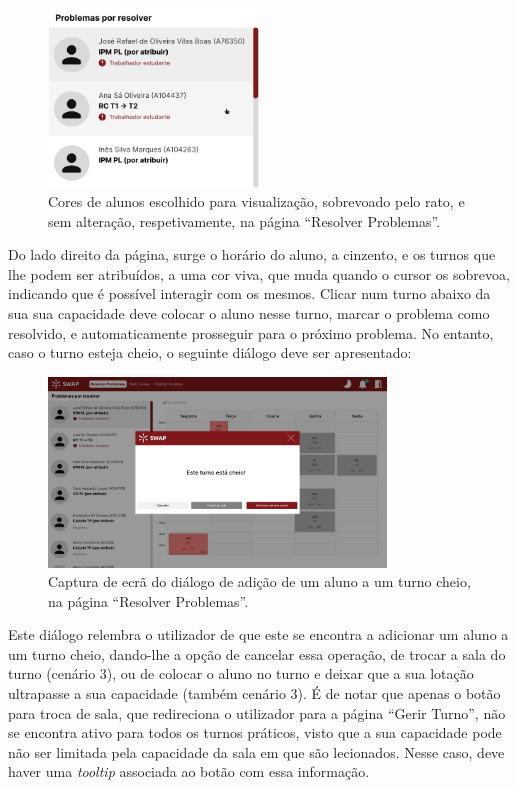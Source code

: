 \documentclass[12pt, a4paper]{article}
\begin{document}
\begin{figure}[H]
    \centering
    \includegraphics[width=0.5\textwidth]{res/prototype/resolver-problemas-hover.png}
    \caption{
        \onehalfspacing
        Cores de alunos escolhido para visualização, sobrevoado pelo rato, e sem alteração,
        respetivamente, na página ``Resolver Problemas''.
    }
    \label{resolver-problemas-hover}
\end{figure}

Do lado direito da página, surge o horário do aluno, a cinzento, e os turnos que lhe podem ser
atribuídos, a uma cor viva, que muda quando o cursor os sobrevoa, indicando que é possível interagir
com os mesmos. Clicar num turno abaixo da sua sua capacidade deve colocar o aluno nesse turno,
marcar o problema como resolvido, e automaticamente prosseguir para o próximo problema. No entanto,
caso o turno esteja cheio, o seguinte diálogo deve ser apresentado:

\begin{figure}[H]
    \centering
    \includegraphics[width=0.8\textwidth]{res/prototype/dialogo-turno-cheio.png}
    \caption{
        \onehalfspacing
        Captura de ecrã do diálogo de adição de um aluno a um turno cheio, na página
        ``Resolver Problemas''.
    }
    \label{dialogo-turno-cheio}
\end{figure}

Este diálogo relembra o utilizador de que este se encontra a adicionar um aluno a um turno cheio,
dando-lhe a opção de cancelar essa operação, de trocar a sala do turno (cenário 3), ou de colocar o
aluno no turno e deixar que a sua lotação ultrapasse a sua capacidade (também cenário 3). É de notar
que apenas o botão para troca de sala, que redireciona o utilizador para a página ``Gerir Turno'',
não se encontra ativo para todos os turnos práticos, visto que a sua capacidade pode não ser
limitada pela capacidade da sala em que são lecionados. Nesse caso, deve haver uma \emph{tooltip}
associada ao botão com essa informação.
\end{document}
